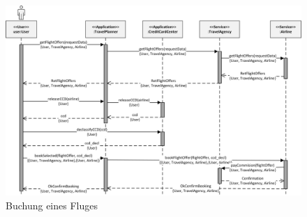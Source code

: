 \begin{figure}[htp]
	\centering
  	\includegraphics[width=1\textwidth]{images/travelplanner_seq_new.png}
	\caption{Buchung eines Fluges}
	\label{img:travelplanner:seq:new}
\end{figure} \par

